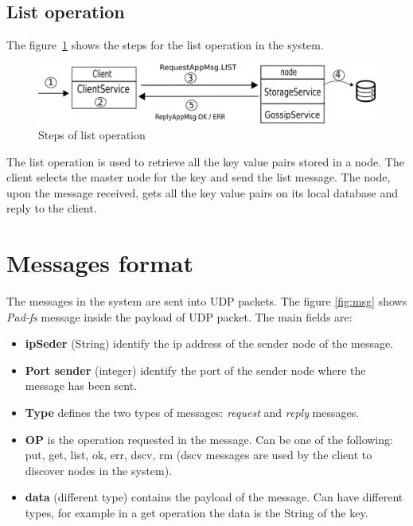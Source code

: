 \begin{•}
\subsection*{List operation}

The figure~\ref{fig:list} shows the steps for the list operation in the system.
\begin{figure}[H]
\centering
\includegraphics[scale=0.5]{figures/list.png}
\caption{Steps of list operation}
\label{fig:list}
\end{figure}

The list operation is used to retrieve all the key value pairs stored in a node.
The client selects the master node for the key and send the list message. The node, upon the message received, gets all the key value pairs on its local database and reply to the client.


\section{Messages format}
The messages in the system are sent into UDP packets. The figure \ref{fig:msg} shows \emph{Pad-fs} message inside the payload of UDP packet. The main fields are:

\begin{itemize}
\item \textbf{ipSeder} (String) identify the ip address of the sender node of the message. 
\item \textbf{Port sender} (integer) identify the port of the sender node where the message has been sent.
\item \textbf{Type} defines the two types of messages: \textit{request} and \textit{reply} messages.
\item \textbf{OP} is the operation requested in the message. Can be one of the following: put, get, list, ok, err, dscv, rm (dscv messages are used by the client to discover nodes in the system).
\item \textbf{data} (different type) contains the payload of the message.  Can have different types, for example in a get operation the data is the String of the key.
\end{itemize}



\end{•}
